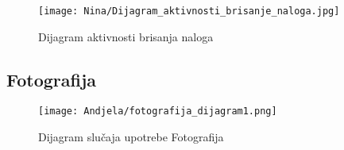 \documentclass[a4paper]{article}
\begin{document}
\begin{figure}[H]
    \centering
    \texttt{[image: Nina/Dijagram\_aktivnosti\_brisanje\_naloga.jpg]}
    \caption{Dijagram aktivnosti brisanja naloga}
    \label{fig:RegistracijaZ}
\end{figure}


\subsection{Fotografija}

\begin{figure}[htp]
    \centering
    \texttt{[image: Andjela/fotografija\_dijagram1.png]}
    \caption{Dijagram slučaja upotrebe Fotografija}
    \label{fig:PrenosiviBar}
\end{figure}
\end{document}
